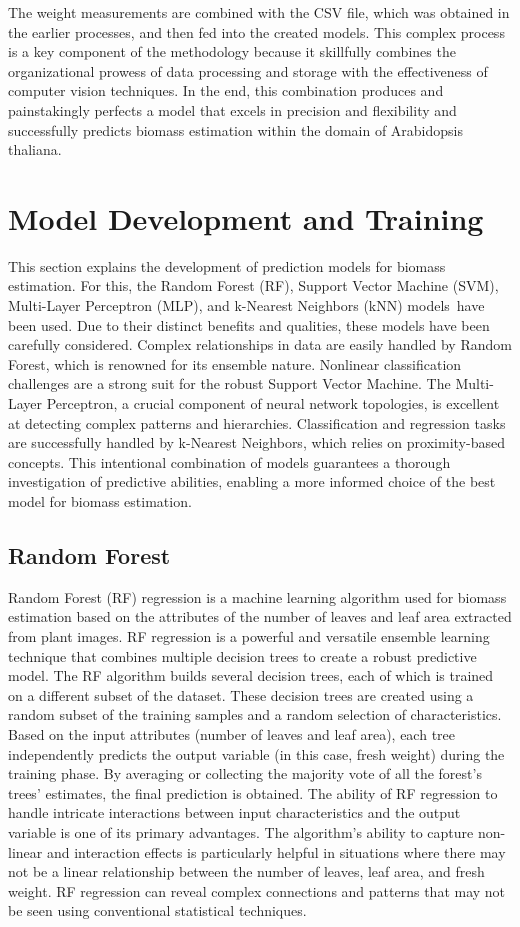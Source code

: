 \documentclass[a4paper,11pt]{report}%
\renewcommand{\\}{\vspace*{0.5\baselineskip} \newline}
\begin{document}
\noindent The weight measurements are combined with the CSV file, which was obtained in the earlier processes, and then fed into the created models. This complex process is a key component of the methodology because it skillfully combines the organizational prowess of data processing and storage with the effectiveness of computer vision techniques. In the end, this combination produces and painstakingly perfects a model that excels in precision and flexibility and successfully predicts biomass estimation within the domain of Arabidopsis thaliana. 


\section{Model Development and Training}
This section explains the development of prediction models for biomass estimation. For this, the Random Forest (RF), Support Vector Machine (SVM), Multi-Layer Perceptron (MLP), and k-Nearest Neighbors (kNN) models have been used. Due to their distinct benefits and qualities, these models have been carefully considered. Complex relationships in data are easily handled by Random Forest, which is renowned for its ensemble nature. Nonlinear classification challenges are a strong suit for the robust Support Vector Machine. The Multi-Layer Perceptron, a crucial component of neural network topologies, is excellent at detecting complex patterns and hierarchies. Classification and regression tasks are successfully handled by k-Nearest Neighbors, which relies on proximity-based concepts.
This intentional combination of models guarantees a thorough investigation of predictive abilities, enabling a more informed choice of the best model for biomass estimation.


\subsection{Random Forest}
Random Forest (RF) regression is a machine learning algorithm used for biomass estimation based on the attributes of the number of leaves and leaf area extracted from plant images. RF regression is a powerful and versatile ensemble learning technique that combines multiple decision trees to create a robust predictive model.
The RF algorithm builds several decision trees, each of which is trained on a different subset of the dataset. These decision trees are created using a random subset of the training samples and a random selection of characteristics. Based on the input attributes (number of leaves and leaf area), each tree independently predicts the output variable (in this case, fresh weight) during the training phase. By averaging or collecting the majority vote of all the forest's trees' estimates, the final prediction is obtained.
The ability of RF regression to handle intricate interactions between input characteristics and the output variable is one of its primary advantages. The algorithm's ability to capture non-linear and interaction effects is particularly helpful in situations where there may not be a linear relationship between the number of leaves, leaf area, and fresh weight. RF regression can reveal complex connections and patterns that may not be seen using conventional statistical techniques.
\end{document}
